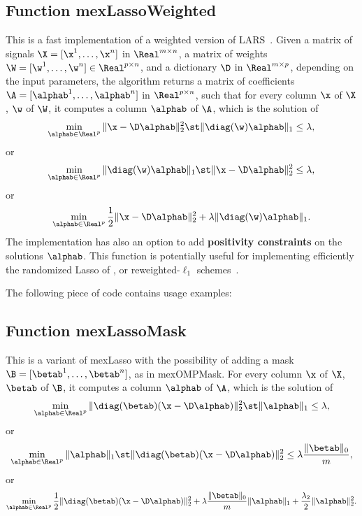\documentclass[a4paper, 11pt]{article}
\begin{document}
\subsection{Function mexLassoWeighted}
This is a fast implementation of a weighted version of LARS~\cite{efron}. Given a matrix of signals $\X=[\x^1,\ldots,\x^n]$  in $\Real^{m \times n}$, a matrix of weights $\W=[\w^1,\ldots,\w^n] \in \Real^{p \times n}$, and a dictionary $\D$ in $\Real^{m \times p}$, depending on the input parameters, the algorithm returns a matrix of coefficients $\A=[\alphab^1,\ldots,\alphab^n]$ in $\Real^{p \times n}$,
     such that for every column $\x$ of $\X$, $\w$ of $\W$, it computes a column $\alphab$ of $\A$,  which is the solution of
     \begin{equation}
     \min_{\alphab \in \Real^p} \|\x-\D\alphab\|_2^2 \st \|\diag(\w)\alphab\|_1 \leq \lambda,
     \end{equation}
     or 
     \begin{equation}
     \min_{\alphab \in \Real^p}  \|\diag(\w)\alphab\|_1 \st \|\x-\D\alphab\|_2^2 \leq \lambda,
     \end{equation}
     or
     \begin{equation}
     \min_{\alphab \in \Real^p} \frac{1}{2}\|\x-\D\alphab\|_2^2 + \lambda \|\diag(\w)\alphab\|_1.
     \end{equation}
     The implementation has also an option to add {\bf positivity constraints} on
     the solutions $\alphab$.  This function is potentially useful for
     implementing efficiently the randomized Lasso of \cite{meinshausen}, or reweighted-$\ell_1$ schemes~\cite{candes4}.

%    

The following piece of code contains usage examples:



\subsection{Function mexLassoMask}
This is a variant of mexLasso with the possibility of adding a mask $\B=[\betab^1,\ldots,\betab^n]$, as in mexOMPMask. 
For every column $\x$ of $\X$, $\betab$ of $\B$, it computes a column $\alphab$ of $\A$,  which is the solution of
\begin{equation}
\min_{\alphab \in \Real^p} \|\diag(\betab)(\x-\D\alphab)\|_2^2 \st \|\alphab\|_1 \leq \lambda,
   \end{equation}
   or 
   \begin{equation}
   \min_{\alphab \in \Real^p}  \|\alphab\|_1 \st \|\diag(\betab)(\x-\D\alphab)\|_2^2 \leq \lambda\frac{\|\betab\|_0}{m}, 
   \end{equation}
   or
   \begin{equation}
   \min_{\alphab \in \Real^p} \frac{1}{2}\|\diag(\betab)(\x-\D\alphab)\|_2^2 + \lambda \frac{\|\betab\|_0}{m}\|\alphab\|_1 + \frac{\lambda_2}{2}\|\alphab\|_2^2. 
   \end{equation}
\end{document}
